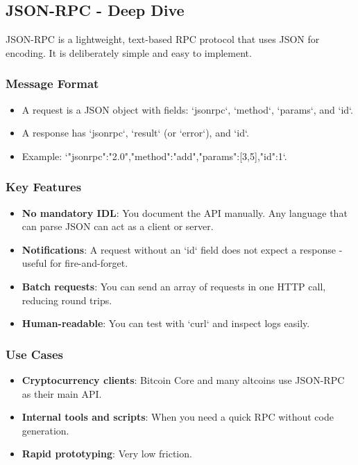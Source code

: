 \documentclass[10pt,a4paper]{article}
\begin{document}
\subsection{JSON-RPC - Deep Dive}
JSON-RPC is a lightweight, text-based RPC protocol that uses JSON for encoding. It is deliberately simple and easy to implement.

\subsubsection{Message Format}
\begin{itemize}
    \item A request is a JSON object with fields: `jsonrpc`, `method`, `params`, and `id`.
    \item A response has `jsonrpc`, `result` (or `error`), and `id`.
    \item Example: `{"jsonrpc":"2.0","method":"add","params":[3,5],"id":1}`.
\end{itemize}

\subsubsection{Key Features}
\begin{itemize}
    \item \textbf{No mandatory IDL}: You document the API manually. Any language that can parse JSON can act as a client or server.
    \item \textbf{Notifications}: A request without an `id` field does not expect a response - useful for fire-and-forget.
    \item \textbf{Batch requests}: You can send an array of requests in one HTTP call, reducing round trips.
    \item \textbf{Human-readable}: You can test with `curl` and inspect logs easily.
\end{itemize}

\subsubsection{Use Cases}
\begin{itemize}
    \item \textbf{Cryptocurrency clients}: Bitcoin Core and many altcoins use JSON-RPC as their main API.
    \item \textbf{Internal tools and scripts}: When you need a quick RPC without code generation.
    \item \textbf{Rapid prototyping}: Very low friction.
\end{itemize}
\end{document}
